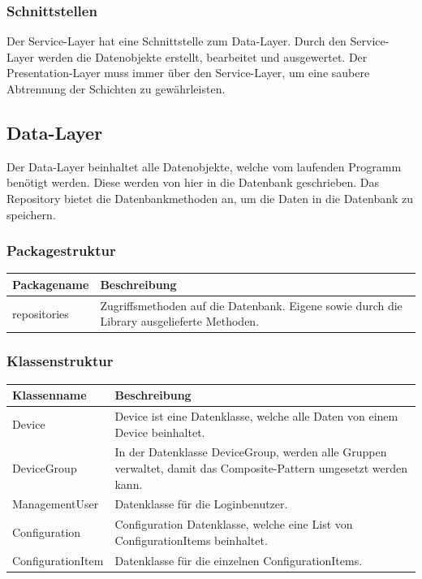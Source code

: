 \subsubsection{Schnittstellen}
Der Service-Layer hat eine Schnittstelle zum Data-Layer. Durch den Service-Layer werden die Datenobjekte erstellt, bearbeitet und ausgewertet. Der Presentation-Layer muss immer über den Service-Layer, um eine saubere Abtrennung der Schichten zu gewährleisten.

\newpage

\subsection{Data-Layer}
Der Data-Layer beinhaltet alle Datenobjekte, welche vom laufenden Programm benötigt werden. Diese werden von hier in die Datenbank geschrieben. Das Repository bietet die Datenbankmethoden an, um die Daten in die Datenbank zu speichern.

\subsubsection{Packagestruktur}
\begin{table}[H]
\centering
    \begin{tabular}{@{}l p{11.9cm} @{}}\toprule    
    {Packagename} & {Beschreibung}\\ \midrule
    repositories & Zugriffsmethoden auf die Datenbank. Eigene sowie durch die Library ausgelieferte Methoden. \\       
    \bottomrule
    \end{tabular}
\end{table}

\subsubsection{Klassenstruktur}
\begin{table}[H]
\centering
    \begin{tabular}{@{}l p{11.9cm} @{}}\toprule    
    {Klassenname} & {Beschreibung}\\ \midrule
    Device & Device ist eine Datenklasse, welche alle Daten von einem Device beinhaltet.\\
    DeviceGroup & In der Datenklasse DeviceGroup, werden alle Gruppen verwaltet, damit das Composite-Pattern umgesetzt werden kann.\\
    ManagementUser & Datenklasse für die Loginbenutzer.\\
    Configuration & Configuration Datenklasse, welche eine List von ConfigurationItems beinhaltet. \\
    ConfigurationItem & Datenklasse für die einzelnen ConfigurationItems.\\
    \bottomrule
    \end{tabular}
\end{table}
